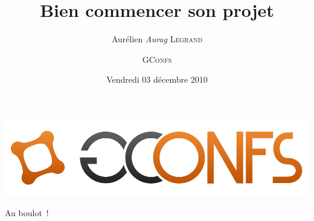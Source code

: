\documentclass{beamer}
\begin{document}
\title{Bien commencer son projet}
\author{Aurélien \textit{Aurag} \textsc{Legrand} \and \textsc{GConfs}}
\date{Vendredi 03 décembre 2010}

\begin{frame}
  \begin{center}
    \includegraphics[scale=0.35]{images/logo}
  \end{center}

  \maketitle
\end{frame}

\begin{frame}
  \tableofcontents
\end{frame}










\begin{frame}
  Au boulot~!
\end{frame}
\end{document}

